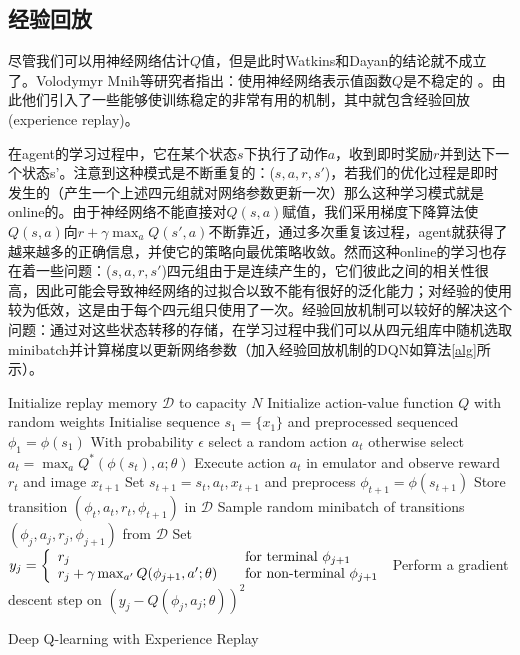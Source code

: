 \subsection{经验回放}
尽管我们可以用神经网络估计$Q$值，但是此时Watkins和Dayan的结论就不成立了。Volodymyr Mnih等研究者指出：使用神经网络表示值函数$Q$是不稳定的 \cite{hado2012double}。由此他们引入了一些能够使训练稳定的非常有用的机制，其中就包含经验回放 (experience replay)。

在agent的学习过程中，它在某个状态$s$下执行了动作$a$，收到即时奖励$r$并到达下一个状态s'。注意到这种模式是不断重复的：($s, a, r, s'$)，若我们的优化过程是即时发生的（产生一个上述四元组就对网络参数更新一次）那么这种学习模式就是online的。由于神经网络不能直接对$Q(s,a)$赋值，我们采用梯度下降算法使$Q(s,a)$向$r + \gamma \max_a Q(s',a)$不断靠近，通过多次重复该过程，agent就获得了越来越多的正确信息，并使它的策略向最优策略收敛。然而这种online的学习也存在着一些问题：($s, a, r, s'$)四元组由于是连续产生的，它们彼此之间的相关性很高，因此可能会导致神经网络的过拟合以致不能有很好的泛化能力；对经验的使用较为低效，这是由于每个四元组只使用了一次。经验回放机制可以较好的解决这个问题：通过对这些状态转移的存储，在学习过程中我们可以从四元组库中随机选取minibatch并计算梯度以更新网络参数（加入经验回放机制的DQN如算法\ref{alg}所示）。

\begin{algorithm}[h]
\begin{algorithmic}
\State Initialize replay memory $\mathcal{D}$ to capacity $N$
\State Initialize action-value function $Q$ with random weights
\State Initialise sequence $s_1 = \{x_1\}$ and preprocessed sequenced $\phi_1 = \phi(s_1)$
	\State With probability $\epsilon$ select a random action $a_t$
	\State otherwise select $a_t = \max_{a} Q^*(\phi(s_t), a; \theta)$
	\State Execute action $a_t$ in emulator and observe reward $r_t$ and image $x_{t+1}$
	\State Set $s_{t+1} = s_t,a_t,x_{t+1}$ and preprocess $\phi_{t+1} = \phi(s_{t+1})$
	\State Store transition $\left(\phi_t,a_t,r_t,\phi_{t+1}\right)$ in $\mathcal{D}$
	\State Sample random minibatch of transitions $\left(\phi_j,a_j,r_j,\phi_{j+1}\right)$ from $\mathcal{D}$
	\State Set
	$y_j =
    \left\{
    \begin{array}{l l}
      r_j  \quad & \text{for terminal } \phi_{j+1}\\
      r_j + \gamma \max_{a'} Q(\phi_{j+1}, a'; \theta) \quad & \text{for non-terminal } \phi_{j+1}
    \end{array} \right.$
	\State Perform a gradient descent step on $\left(y_j - Q(\phi_j, a_j; \theta) \right)^2$
\EndFor
\EndFor
\end{algorithmic}
\caption{Deep Q-learning with Experience Replay \cite{hado2011double}}
\label{alg}
\end{algorithm}

